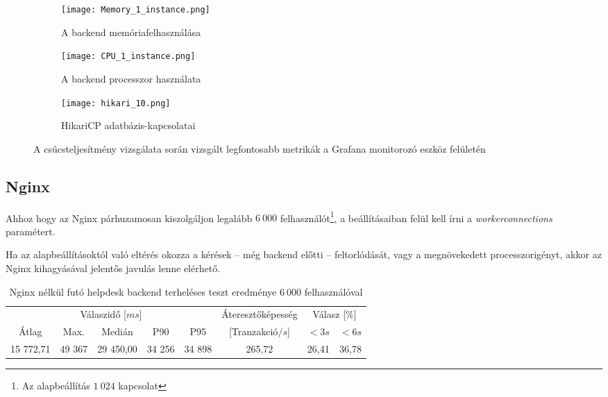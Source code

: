 \begin{figure}[hbt]
	\begin{subfigure}{.95\textwidth}
		\centering
		\texttt{[image: Memory\_1\_instance.png]}  
		\caption{A backend memóriafelhasználása}
		\label{fig:memory_1_instance}

	\end{subfigure}
	\quad

	\begin{subfigure}{.6\textwidth}
		\centering
		\texttt{[image: CPU\_1\_instance.png]}  
		\caption{A backend processzor használata}
		\label{fig:cpu_1_instance}
	\end{subfigure}

	\quad
	\begin{subfigure}{.8\textwidth}
		\centering
		\texttt{[image: hikari\_10.png]}  
		\caption{HikariCP adatbázis-kapcsolatai}
		\label{fig:10_hikari}
	\end{subfigure}
	
	\caption{A csúcsteljesítmény vizsgálata során vizsgált legfontosabb metrikák a Grafana monitorozó eszköz felületén}
	\label{fig:peak_metrics}
\end{figure}

\pagebreak

\subsection{Nginx}
Ahhoz hogy az Nginx párhuzamosan kiszolgáljon legalább $6~000$ felhasználót\footnote{Az alapbeállítás $1~024$ kapcsolat}, a beállításaiban felül kell írni a \mbox{\textit{worker\textunderscore connections}} paramétert.

Ha az alapbeállításoktól való eltérés okozza a kérések --  még backend előtti --   feltorlódását, vagy a megnövekedett processzorigényt, akkor az Nginx kihagyásával jelentős javulás lenne elérhető.

\bigskip
\begin{table}[hbt]
	
	\begin{tabular}{ccccc|c|cc}
		\multicolumn{5}{c|}{Válaszidő [$ms$]}  & Áteresztőképesség & \multicolumn{2}{c}{Válasz [\%]}	\\
		Átlag & Max. & Medián & P90 & P95 &	[Tranzakció$/s$] & $<3s$& $<6s$ \\
		\hline 
		15 772,71 &  49 367 & 29 450,00 & 34 256 & 34 898 & 265,72 & 26,41 & 36,78 \\
	\end{tabular} 
	
	\caption{Nginx nélkül futó helpdesk backend terheléses teszt eredménye $6~000$ felhasználóval}
	\label{tabl:without_nginx}
\end{table}

